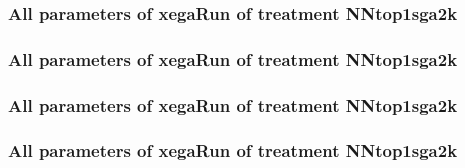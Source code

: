 \documentclass[18pt,c]{beamer}
\begin{document}

 \begin{frame}
 \fontsize{8pt}{9pt}\selectfont
 \frametitle{  All parameters of xegaRun of treatment NNtop1sga2k 
 }

 \label{ExpDtParmTable032.tex}  
 \end{frame}


 \begin{frame}
 \fontsize{8pt}{9pt}\selectfont
 \frametitle{  All parameters of xegaRun of treatment NNtop1sga2k 
 }

 \label{ExpDtParmTable033.tex}  
 \end{frame}


 \begin{frame}
 \fontsize{8pt}{9pt}\selectfont
 \frametitle{  All parameters of xegaRun of treatment NNtop1sga2k 
 }

 \label{ExpDtParmTable034.tex}  
 \end{frame}


 \begin{frame}
 \fontsize{8pt}{9pt}\selectfont
 \frametitle{  All parameters of xegaRun of treatment NNtop1sga2k 
 }

 \label{ExpDtParmTable035.tex}  
 \end{frame}

\end{document}
